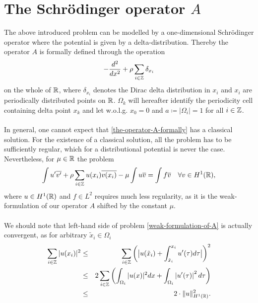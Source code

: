 \chapter{\texorpdfstring{The Schrödinger operator $A$}{The Schrödinger operator A}}

The above introduced problem  can be modelled by a one-dimensional Schrödinger operator where the potential is given by a delta-distribution. Thereby the operator $A$ is formally defined through the operation
\begin{equation}
	- \frac{d^{2}}{dx^{2}} + \rho \sum_{i \in \mathbb{Z}} \delta_{x_{i}} \label{the-operator-A-formally}
\end{equation}
on the whole of $\mathbb{R}$, where $\delta_{x_{i}}$ denotes the Dirac delta distribution in $x_{i}$ and $x_{i}$ are periodically distributed points on $\mathbb{R}$. $\Omega_{k}$ will hereafter identify the periodicity cell containing delta point $x_{k}$ and let w.o.l.g. $x_{0} = 0$ and $a \coloneqq |\Omega_{i}| = 1$ for all $i \in \mathbb{Z}$.
~\\ ~\\
In general, one cannot expect that \eqref{the-operator-A-formally} has a classical
solution. For the existence of a classical solution, all the problem has to be sufficiently regular, which for a distributional potential is never the case. Nevertheless, for $\mu \in \mathbb{R}$ the problem
\begin{equation}
	\int u' \overline{v'} + \rho \sum_{i \in \mathbb{Z}} u(x_{i}) \overline{v(x_{i})} - \mu \int u \overline{v} = \int f \overline{v} \quad \forall v \in H^{1}(\mathbb{R}), \label{weak-formulation-of-A}
\end{equation}	
where $u \in H^{1}(\mathbb{R})$ and $f \in L^{2}$ requires much less regularity, as it is the weak-formulation of our operator $A$ shifted by the constant $\mu$.
~\\ ~\\
We should note that left-hand side of problem \eqref{weak-formulation-of-A} is actually convergent, as for arbitrary $\tilde{x}_{i} \in \Omega_{i}$
\begin{eqnarray}
	\sum_{i \in \mathbb{Z}} |u(x_{i})|^{2} & \leq & \sum_{i \in \mathbb{Z}} \left( \big| u(\tilde{x}_{i}) + \int_{\tilde{x}_{i}}^{x_{i}} u'( \tau ) d\tau \big| \right)^{2} \notag \\
		 & \leq & 2 \sum_{i \in \mathbb{Z}} \left( \int_{\Omega_{i}} |u( x )|^{2} dx +  \int_{\Omega_{i}} \left| u'(\tau) \right|^{2} d\tau \right) \notag \\
		 & \leq & 2 \cdot \| u \|^{2}_{H^{1}(\mathbb{R})}. \label{estimation-for-potential}
\end{eqnarray}

